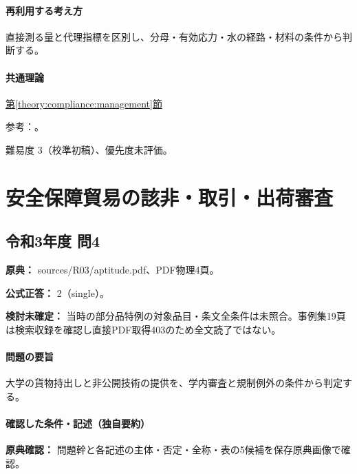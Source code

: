 \paragraph{再利用する考え方} 直接測る量と代理指標を区別し、分母・有効応力・水の経路・材料の条件から判断する。

\paragraph{共通理論} \hyperref[theory:compliance:management]{第\ref*{theory:compliance:management}節}

\par 参考：\cite{eng52_professional,eng52_bcp,eng52_performance,eng52_ve,eng52_control}。

\par 難易度 3（校準初稿）、優先度未評価。

\section{安全保障貿易の該非・取引・出荷審査}

\subsection{令和3年度 問4}
\label{q:r03-reg-apt-04}

\noindent\textbf{原典：} sources/R03/aptitude.pdf、PDF物理4頁。

\textbf{公式正答：} 2（single）。

\par\textbf{検討未確定：} 当時の部分品特例の対象品目・条文全条件は未照合。事例集19頁は検索収録を確認し直接PDF取得403のため全文読了ではない。

\paragraph{問題の要旨} 大学の貨物持出しと非公開技術の提供を、学内審査と規制例外の条件から判定する。

\paragraph{確認した条件・記述（独自要約）}\mbox{}\par

\noindent\textbf{原典確認：} 問題幹と各記述の主体・否定・全称・表の5候補を保存原典画像で確認。\par

